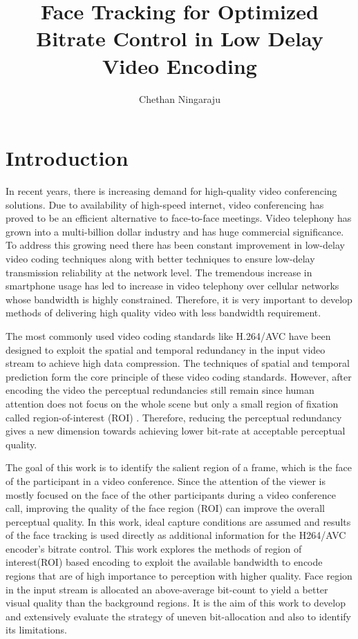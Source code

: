 \documentclass[11pt]{article} %
\title{Face Tracking for Optimized Bitrate Control in Low Delay Video Encoding}
\author{Chethan Ningaraju}
\begin{document}
\maketitle
\clearpage
\tableofcontents
\clearpage
\section{Introduction}
In recent years, there is increasing demand for high-quality video conferencing solutions. Due to availability of high-speed internet, video conferencing has proved to be an efficient alternative to face-to-face meetings. Video telephony has grown into a multi-billion dollar industry and has huge commercial significance. To address this growing need there has been constant improvement in  low-delay video coding techniques along with better techniques to ensure low-delay transmission reliability at the network level. The tremendous increase in smartphone usage has led to increase in video telephony over cellular networks whose bandwidth is highly constrained. Therefore, it is very important to develop methods of delivering high quality video with less bandwidth requirement. 

The most commonly used video coding standards like H.264/AVC have been designed to exploit the spatial and temporal redundancy in the input video stream to achieve high data compression. The techniques of spatial and temporal prediction form the core principle of these video coding standards. However, after encoding the video the perceptual redundancies still remain since human attention does not focus on the whole scene but only a small region of fixation called region-of-interest (ROI) \cite{Perception-model-of-face}. Therefore, reducing the perceptual redundancy gives a new dimension towards achieving lower bit-rate at acceptable perceptual quality.

The goal of this work is to identify the salient region of a frame, which is the face of the participant in a video conference. Since the attention of the viewer is mostly focused on the face of the other participants during a video conference call, improving the quality of the face region (ROI) can improve the overall perceptual quality. In this work, ideal capture conditions are assumed and results of the face tracking is used directly as additional information for the H264/AVC encoder's bitrate control. This work explores the methods of region of interest(ROI) based encoding to exploit the available bandwidth to encode regions that are of high importance to perception with higher quality. Face region in the input stream is allocated an above-average bit-count to yield a better visual quality than the background regions. It is the aim of this work to develop and extensively evaluate the strategy of uneven bit-allocation and also to identify its limitations.
\end{document}
